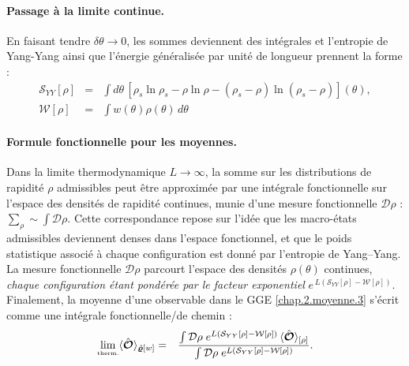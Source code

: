 \paragraph{Passage à la limite continue.}
En faisant tendre $\delta\theta \to 0$, les sommes deviennent des intégrales 
et l'entropie de Yang-Yang ainsi que l’énergie généralisée par unité de longueur prennent la forme :
\begin{eqnarray}
	\mathcal{S}_{YY}[\rho] & = & \int d \theta  \, [ \rho_s\ln \rho_s - \rho \ln \rho - ( \rho_s - \rho ) \ln ( \rho_s - \rho ) ] (\theta) , \label{chap.2.entropi.int}\\
	\mathcal{W}[\rho] & = & \int   w(\theta) \rho(\theta) \, d \theta \label{chap.2.W.int}		
\end{eqnarray}

\paragraph{Formule fonctionnelle pour les moyennes.}

Dans la limite thermodynamique $L \to \infty$, la somme sur les distributions de rapidité $\rho$ admissibles peut être approximée par une intégrale fonctionnelle sur l’espace des densités de rapidité continues, munie d’une mesure fonctionnelle $\mathcal{D}\rho$ : 
\(
\sum_{\rho } \sim \int \mathcal{D} \rho .
\)
Cette correspondance repose sur l’idée que les macro-états admissibles deviennent denses dans l’espace fonctionnel, et que le poids statistique associé à chaque configuration est donné par l’entropie de Yang–Yang.
La mesure fonctionnelle $\mathcal{D}\rho$ parcourt l’espace des densités
$\rho(\theta)$ continues, \emph{chaque configuration étant pondérée par le
facteur exponentiel}
\(
e^{\,L(\mathcal{S}_{YY}[\rho]-\mathcal{W}[\rho])}.
\)
Finalement, la moyenne d'une observable dans le GGE \eqref{chap.2.moyenne.3} s’écrit comme une intégrale fonctionnelle/de chemin :
\begin{eqnarray}
	\underset{\mbox{\tiny therm.}}{\lim} \langle \hat{\bm{\mathcal{O}}} \rangle_{\hat{\bm{\varrho}}[w]} & = & \frac{\int \mathcal{D} \rho \; e^{L (\mathcal{S}_{YY}[\rho] - \mathcal{W}[\rho])} \, \langle\hat{\bm{\mathcal{O}}}\rangle_{[\rho]}}{\int \mathcal{D} \rho \; e^{L (\mathcal{S}_{YY}[\rho] - \mathcal{W}[\rho])}}. \label{chap:TBA:eq:ensemble_average}
\end{eqnarray}


